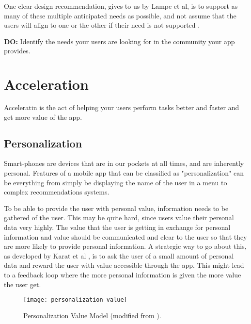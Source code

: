 One clear design recommendation, gives to us by Lampe et al, is to support as many of these multiple anticipated needs as possible, and not assume that the users will align to one or the other if their need is not supported \cite{Lampe2010}.

\begin{displayquote}
  \textbf{DO:} Identify the needs your users are looking for in the community your app provides.
\end{displayquote}

\section{Acceleration}
Acceleratin is the act of helping your users perform tasks better and faster and get more value of the app.

\subsection{Personalization}
Smart-phones are devices that are in our pockets at all times, and are inherently personal. Features of a mobile app that can be classified as "personalization" can be everything from simply be displaying the name of the user in a menu to complex recommendations systems.

To be able to provide the user with personal value, information needs to be gathered of the user. This may be quite hard, since users value their personal data very highly. The value that the user is getting in exchange for personal information and value should be communicated and clear to the user so that they are more likely to provide personal information. A strategic way to go about this, as developed by Karat et al \cite{Karat2003}, is to ask the user of a small amount of personal data and reward the user with value accessible through the app. This might lead to a feedback loop where the more personal information is given the more value the user get.

\begin{figure}[h]
  \centering
    \texttt{[image: personalization-value]}
  \caption{Personalization Value Model (modified from \cite{Karat2003}).}
  \label{fig:personalization-value}
\end{figure}

%


